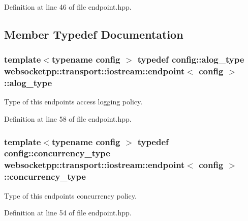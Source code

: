 Definition at line 46 of file endpoint.\+hpp.



\subsection{Member Typedef Documentation}
\hypertarget{classwebsocketpp_1_1transport_1_1iostream_1_1endpoint_af176dc3a44caefab71de271c27873c81}{}
\subsubsection[{alog\+\_\+type}]{\setlength{\rightskip}{0pt plus 5cm}template$<$typename config $>$ typedef config\+::alog\+\_\+type {\bf websocketpp\+::transport\+::iostream\+::endpoint}$<$ config $>$\+::{\bf alog\+\_\+type}}\label{classwebsocketpp_1_1transport_1_1iostream_1_1endpoint_af176dc3a44caefab71de271c27873c81}


Type of this endpoint\textquotesingle{}s access logging policy. 



Definition at line 58 of file endpoint.\+hpp.

\hypertarget{classwebsocketpp_1_1transport_1_1iostream_1_1endpoint_ad7787af753771da00bf8e6477e52b615}{}
\subsubsection[{concurrency\+\_\+type}]{\setlength{\rightskip}{0pt plus 5cm}template$<$typename config $>$ typedef config\+::concurrency\+\_\+type {\bf websocketpp\+::transport\+::iostream\+::endpoint}$<$ config $>$\+::{\bf concurrency\+\_\+type}}\label{classwebsocketpp_1_1transport_1_1iostream_1_1endpoint_ad7787af753771da00bf8e6477e52b615}


Type of this endpoint\textquotesingle{}s concurrency policy. 



Definition at line 54 of file endpoint.\+hpp.

